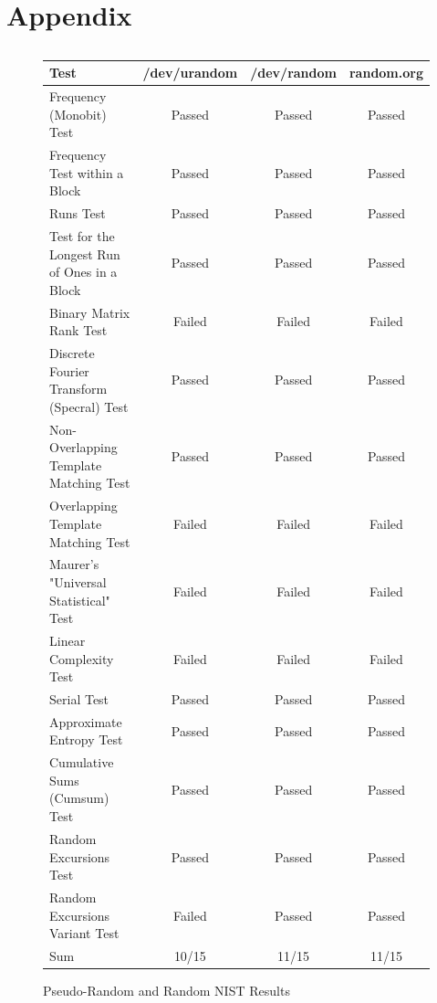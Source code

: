 \documentclass[conference]{IEEEtran}
\begin{document}



\newpage
\onecolumn
\section*{Appendix}

\subsection{}
\begin{figure}[H]
    \centering
    \begin{tabular}{l|c|c|c}
        Test & /dev/urandom & /dev/random & random.org \\ \hline
        Frequency (Monobit) Test & Passed & Passed & Passed \\
        Frequency Test within a Block & Passed & Passed & Passed \\
        Runs Test & Passed & Passed & Passed \\
        Test for the Longest Run of Ones in a Block & Passed & Passed & Passed \\
        Binary Matrix Rank Test & Failed & Failed & Failed \\
        Discrete Fourier Transform (Specral) Test & Passed & Passed & Passed \\
        Non-Overlapping Template Matching Test & Passed & Passed & Passed \\
        Overlapping Template Matching Test & Failed & Failed & Failed \\
        Maurer's "Universal Statistical" Test & Failed & Failed & Failed \\
        Linear Complexity Test & Failed & Failed & Failed \\
        Serial Test & Passed & Passed & Passed \\
        Approximate Entropy Test & Passed & Passed & Passed \\
        Cumulative Sums (Cumsum) Test & Passed & Passed & Passed \\
        Random Excursions Test & Passed & Passed & Passed \\
        Random Excursions Variant Test & Failed & Passed & Passed \\ \hline
        Sum & 10/15 & 11/15 & 11/15
        \end{tabular}
    \caption{Pseudo-Random and Random NIST Results}
    \label{fig:nist_random}
\end{figure}
\end{document}
